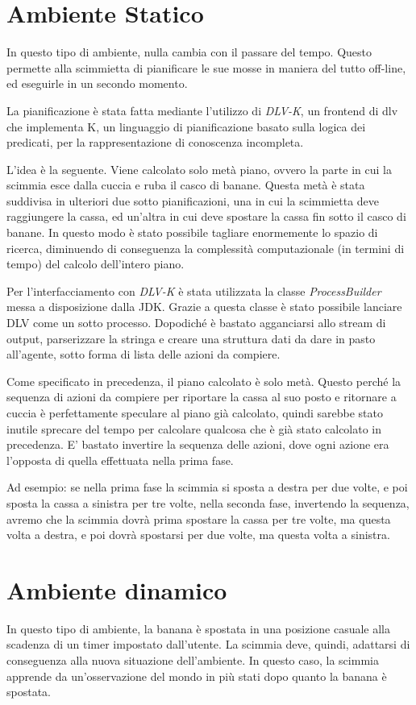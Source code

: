 \documentclass[a4paper,10pt]{article}
\begin{document}
    \section{Ambiente Statico}
	In questo tipo di ambiente, nulla cambia con il passare del tempo. Questo permette alla scimmietta di pianificare le sue mosse in
	maniera del tutto off-line, ed eseguirle in un secondo momento.
	
	La pianificazione è stata fatta mediante l'utilizzo di \emph{DLV-K}, un frontend di dlv che implementa K, un linguaggio di pianificazione
	basato sulla logica dei predicati, per la rappresentazione di conoscenza incompleta.
	
	L'idea è la seguente. Viene calcolato solo metà piano, ovvero la parte in cui la scimmia esce dalla cuccia e ruba il casco di banane.
	Questa metà è stata suddivisa in ulteriori due sotto pianificazioni, una in cui la scimmietta deve raggiungere
	la cassa, ed un'altra in cui deve spostare la cassa fin sotto il casco di banane. In questo modo è stato possibile tagliare enormemente
	lo spazio di ricerca, diminuendo di conseguenza la complessità computazionale (in termini di tempo) del calcolo dell'intero piano.
	
	Per l'interfacciamento con \emph{DLV-K} è stata utilizzata la classe \emph{ProcessBuilder} messa a disposizione dalla JDK.
	Grazie a questa classe è stato possibile lanciare DLV come un sotto processo.
	Dopodiché è bastato agganciarsi allo stream di output, parserizzare
	la stringa e creare una struttura dati da dare in pasto all'agente, sotto forma di lista delle azioni da compiere.
	
	Come specificato in precedenza, il piano calcolato è solo metà. Questo perché la sequenza di azioni
	da compiere per riportare la cassa al suo posto e ritornare a cuccia è perfettamente speculare al piano già calcolato, quindi
	sarebbe stato inutile sprecare del tempo per calcolare qualcosa che è già stato calcolato in precedenza. E' bastato
	invertire la sequenza delle azioni, dove ogni azione era l'opposta di quella effettuata nella prima fase.
	
	Ad esempio: se nella prima fase la scimmia si sposta a destra per due volte, e poi sposta la cassa a sinistra per tre volte,
	nella seconda fase, invertendo la sequenza, avremo che la scimmia dovrà
	prima spostare la cassa per tre volte, ma questa volta a destra, e poi dovrà spostarsi per due volte, ma questa volta a sinistra.
	
    \section{Ambiente dinamico}
	In questo tipo di ambiente, la banana è spostata in una posizione casuale alla scadenza di un timer impostato dall'utente.
	La scimmia deve, quindi, adattarsi di conseguenza alla nuova situazione dell'ambiente. 
	In questo caso, la scimmia apprende da un'osservazione del mondo in più stati dopo quanto la banana è spostata.
	
\end{document}

